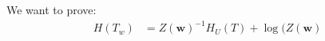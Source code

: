 \documentclass[a4paper,12pt]{ETHexercise}
\begin{document}
\begin{question}
\begin{subquestion}
	\end{subquestion}
	\begin{subquestion}
		We want to prove:\\
		\begin{align}
			H(T_w) & = Z(\boldsymbol{w})^{-1} H_U(T) + \log(Z(\boldsymbol{w})
		\end{align}

\end{subquestion}
\end{question}
\end{document}

